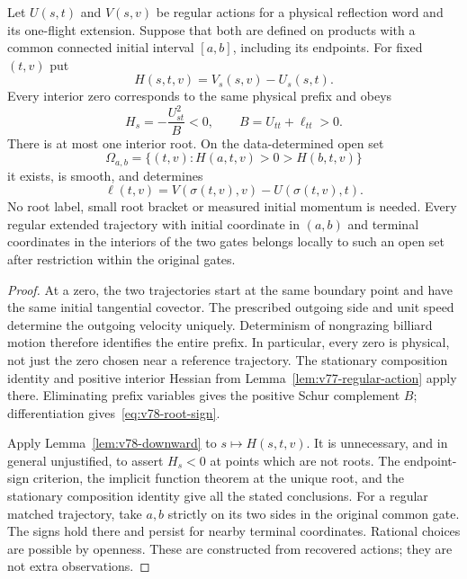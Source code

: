 \begin{theorem}
\label{thm:v78-root-free}
Let $U(s,t)$ and $V(s,v)$ be regular actions for a physical reflection
word and its one-flight extension.  Suppose that both are defined on
products with a common connected initial interval $[a,b]$, including
its endpoints.  For fixed $(t,v)$ put
\[
 H(s,t,v)=V_s(s,v)-U_s(s,t).
\]
Every interior zero corresponds to the same physical prefix and obeys
\begin{equation}\label{eq:v78-root-sign}
 H_s=-\frac{U_{st}^2}{B}<0,\qquad B=U_{tt}+\ell_{tt}>0.
\end{equation}
There is at most one interior root.  On the data-determined open set
\[
 \Omega_{a,b}=\{(t,v):H(a,t,v)>0>H(b,t,v)\}
\]
it exists, is smooth, and determines
\[
 \ell(t,v)=V(\sigma(t,v),v)-U(\sigma(t,v),t).
\]
No root label, small root bracket or measured initial momentum is needed.
Every regular extended trajectory with initial coordinate in $(a,b)$
and terminal coordinates in the interiors of the two gates belongs
locally to such an open set after restriction within the original gates.
\end{theorem}
\begin{proof}
At a zero, the two trajectories start at the same boundary point and
have the same initial tangential covector.  The prescribed outgoing side
and unit speed determine the outgoing velocity uniquely.  Determinism
of nongrazing billiard motion therefore identifies the entire prefix.
In particular, every zero is physical, not just the zero chosen near a
reference trajectory.  The stationary composition identity and positive
interior Hessian from Lemma~\ref{lem:v77-regular-action} apply there.
Eliminating prefix variables gives the positive Schur complement $B$;
differentiation gives~\eqref{eq:v78-root-sign}.

Apply Lemma~\ref{lem:v78-downward} to $s\mapsto H(s,t,v)$.  It is
unnecessary, and in general unjustified, to assert $H_s<0$ at points
which are not roots.  The endpoint-sign criterion, the implicit function
theorem at the unique root, and the stationary composition identity give
all the stated conclusions.  For a regular matched trajectory, take
$a,b$ strictly on its two sides in the original common gate.  The signs
hold there and persist for nearby terminal coordinates.  Rational
choices are possible by openness.  These are constructed from recovered
actions; they are not extra observations.
\end{proof}

